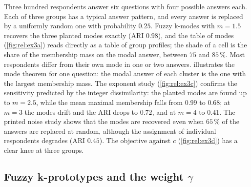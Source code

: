 Three hundred respondents answer six questions with four possible answers each. Each of three groups has a typical answer pattern, and every answer is replaced by a uniformly random one with probability $0.25$. Fuzzy k-modes with $m=1.5$ recovers the three planted modes exactly (ARI $0.98$), and the table of modes (\cref{fig:rel:ex3a}) reads directly as a table of group profiles; the shade of a cell is the share of the membership mass on the modal answer, between $75$ and $85$\,\%. Most respondents differ from their own mode in one or two answers.  illustrates the mode theorem for one question: the modal answer of each cluster is the one with the largest membership mass. The exponent study (\cref{fig:rel:ex3c}) confirms the sensitivity predicted by the integer dissimilarity: the planted modes are found up to $m=2.5$, while the mean maximal membership falls from $0.99$ to $0.68$; at $m=3$ the modes drift and the ARI drops to $0.72$, and at $m=4$ to $0.41$. The printed noise study shows that the modes are recovered even when $65$\,\% of the answers are replaced at random, although the assignment of individual respondents degrades (ARI $0.45$). The objective against $c$ (\cref{fig:rel:ex3d}) has a clear knee at three groups.


\subsection{Fuzzy k-prototypes and the weight \texorpdfstring{$\gamma$}{gamma}}

